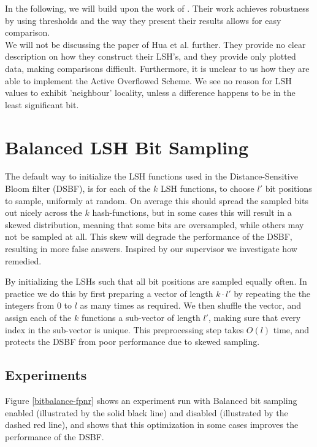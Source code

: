 \documentclass[a4paper,11pt]{article}
\begin{document}
In the following, we will build upon the work of \cite{paper:harvard}.  Their work achieves robustness by using thresholds and the way they present their results allows for easy comparison.\\

We will not be discussing the paper of Hua et al.\cite{paper:hua} further. They provide no clear description on how they construct their LSH's, and they provide only plotted data, making comparisons difficult. Furthermore, it is unclear to us how they are able to implement the Active Overflowed Scheme. We see no reason for LSH values to exhibit 'neighbour' locality, unless a difference happens to be in the least significant bit.



\section{Balanced LSH Bit Sampling} \label{sec:balanced}

The default way to initialize the LSH functions used in the Distance-Sensitive Bloom filter (DSBF), is for each of the $k$ LSH functions, to choose $l'$ bit positions to sample, uniformly at random. On average this should spread the sampled bits out nicely across the $k$ hash-functions, but in some cases this will result in a skewed distribution, meaning that some bits are oversampled, while others may not be sampled at all. This skew will degrade the performance of the DSBF, resulting in more false answers.
Inspired by our supervisor we investigate how remedied.

By initializing the LSHs such that all bit positions are sampled equally often.
In practice we do this by first preparing a vector of length $k \cdot l'$ by repeating the the integers from 0 to $l$ as many times as required. We then shuffle the vector, and assign each of the $k$ functions a sub-vector of length $l'$, making sure that every index in the sub-vector is unique. This preprocessing step takes $O(l)$ time, and protects the DSBF from poor performance due to skewed sampling.


\subsection{Experiments}
Figure \ref{bitbalance-fpnr} shows an experiment run with Balanced bit sampling enabled (illustrated by the solid black line) and disabled (illustrated by the dashed red line), and shows that this optimization in some cases improves the performance of the DSBF.
\end{document}
